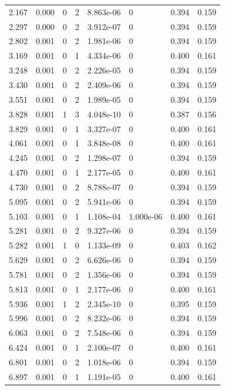 \documentclass[preview]{standalone}
\begin{document}
{{\begin{tabular}{L{1.2cm}C{1.2cm} C{0.3cm}C{0.5cm} C{1.4cm}C{1.4cm} C{1.4cm}C{1.4cm}}
  2.167  &  0.000  & 0     &  2 &  8.863e-06  & 0  & 0.394 &  0.159   \\ 
  2.297  &  0.000  & 0     &  2 &  3.912e-07  & 0  & 0.394 &  0.159   \\ 
  2.802  &  0.001  & 0     &  2 &  1.981e-06  & 0  & 0.394 &  0.159   \\ 
  3.169  &  0.001  & 0     &  1 &  4.334e-06  & 0  & 0.400 &  0.161   \\ 
  3.248  &  0.001  & 0     &  2 &  2.226e-05  & 0  & 0.394 &  0.159   \\ 
  3.430  &  0.001  & 0     &  2 &  2.409e-06  & 0  & 0.394 &  0.159   \\ 
  3.551  &  0.001  & 0     &  2 &  1.989e-05  & 0  & 0.394 &  0.159   \\ 
  3.828  &  0.001  & 1     &  3 &  4.048e-10  & 0  & 0.387 &  0.156   \\ 
  3.829  &  0.001  & 0     &  1 &  3.327e-07  & 0  & 0.400 &  0.161   \\ 
  4.061  &  0.001  & 0     &  1 &  3.848e-08  & 0  & 0.400 &  0.161   \\ 
  4.245  &  0.001  & 0     &  2 &  1.298e-07  & 0  & 0.394 &  0.159   \\ 
  4.470  &  0.001  & 0     &  1 &  2.177e-05  & 0  & 0.400 &  0.161   \\ 
  4.730  &  0.001  & 0     &  2 &  8.788e-07  & 0  & 0.394 &  0.159   \\ 
  5.095  &  0.001  & 0     &  2 &  5.941e-06  & 0  & 0.394 &  0.159   \\ 
  5.103  &  0.001  & 0     &  1 &  1.108e-04  & 1.000e-06  & 0.400 &  0.161   \\ 
  5.281  &  0.001  & 0     &  2 &  9.327e-06  & 0  & 0.394 &  0.159   \\ 
  5.282  &  0.001  & 1     &  0 &  1.133e-09  & 0  & 0.403 &  0.162   \\ 
  5.629  &  0.001  & 0     &  2 &  6.626e-06  & 0  & 0.394 &  0.159   \\ 
  5.781  &  0.001  & 0     &  2 &  1.356e-06  & 0  & 0.394 &  0.159   \\ 
  5.813  &  0.001  & 0     &  1 &  2.177e-06  & 0  & 0.400 &  0.161   \\ 
  5.936  &  0.001  & 1     &  2 &  2.345e-10  & 0  & 0.395 &  0.159   \\ 
  5.996  &  0.001  & 0     &  2 &  8.232e-06  & 0  & 0.394 &  0.159   \\ 
  6.063  &  0.001  & 0     &  2 &  7.548e-06  & 0  & 0.394 &  0.159   \\ 
  6.424  &  0.001  & 0     &  1 &  2.100e-07  & 0  & 0.400 &  0.161   \\ 
  6.801  &  0.001  & 0     &  2 &  1.018e-06  & 0  & 0.394 &  0.159   \\ 
  6.897  &  0.001  & 0     &  1 &  1.191e-05  & 0  & 0.400 &  0.161   \\ 
\hline 
\end{tabular} 

}}
\end{document}
